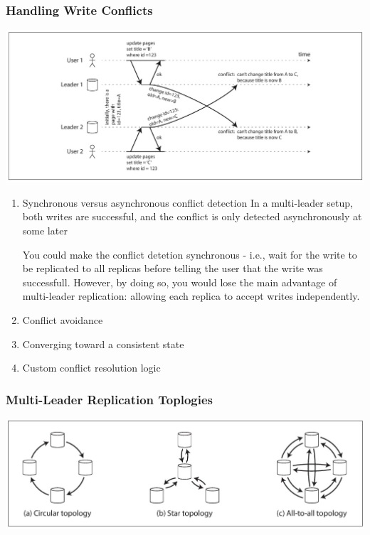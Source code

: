 \documentclass[11pt]{article}
\begin{document}
\subsubsection{Handling Write Conflicts}
\label{sec:orgfe2c66a}
\begin{center}
\includegraphics[width=.8\textwidth]{../images/ddia/1.jpg}
\end{center}
\begin{enumerate}
\item Synchronous versus  asynchronous conflict detection
\label{sec:org47a8931}
In a multi-leader setup, both writes are successful, and the conflict is only detected
asynchronously at some later

You could make the conflict detetion synchronous - i.e., wait for the write to be replicated to
all replicas before telling the user that the write was successfull. However, by doing so, you
would lose the main advantage of multi-leader replication: allowing each replica to accept
writes independently.
\item Conflict avoidance
\label{sec:org7073fbf}
\item Converging toward a consistent state
\label{sec:orgf8914d7}
\item Custom conflict resolution logic
\label{sec:orgb569b14}
\end{enumerate}
\subsubsection{Multi-Leader Replication Toplogies}
\label{sec:orgfdbe32c}
\begin{center}
\includegraphics[width=.9\textwidth]{../images/ddia/2.jpg}
\end{center}
\end{document}
